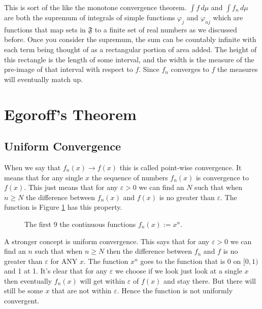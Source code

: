 \documentclass[oneside]{book}
\newenvironment{proof}[1][Proof]{\begin{trivlist}
\item[\hskip \labelsep {\bfseries #1}]}{\end{trivlist}}
\begin{document}
\begin{proof}
This is sort of the like the monotone convergence theorem. $\int f\, d\mu$ and $\int f_n\, d\mu$ are both the supremum of integrals of simple functions $\varphi_j$ and $\varphi_{nj}$ which are functions that map sets in $\mathfrak{F}$ to a finite set of real numbers as we discussed before. Once you consider the supremum, the sum can be countably infinite with each term being thought of as a rectangular portion of area added. The height of this rectangle is the length of some interval, and the width is the measure of the pre-image of that interval with respect to $f$. Since $f_n$ converges to $f$ the measures will eventually match up. 

\end{proof}

\section{Egoroff's Theorem}

\subsection{Uniform Convergence}
When we say that $f_n(x) \to f(x)$ this is called point-wise convergence. It means that for any single $x$ the sequence of numbers $f_n(x)$ is convergence to $f(x)$. This just means that for any $\varepsilon >0$ we can find an $N$ such that when $n \ge N$ the difference between $f_n(x)$ and $f(x)$ is no greater than $\varepsilon$. The function is Figure \ref{fig:uniformConvergence} has this property. 

\begin{figure}[h]
    \centering
    \caption{The first 9 the continuous functions $f_n(x) := x^n$.}
    \label{fig:uniformConvergence}
\end{figure}

A stronger concept is uniform convergence. This says that for any $\varepsilon >0$ we can find an $n$ such that when $n \ge N$ then the difference between $f_n$ and $f$ is no greater than $\varepsilon$ for ANY $x$. The function $x^n$ goes to the function that is 0 on $[0,1)$ and 1 at 1. It's clear that for any $\varepsilon$ we choose if we look just look at a single $x$ then eventually $f_n(x)$ will get within $\varepsilon$ of $f(x)$ and stay there. But there will still be some $x$ that are not within $\varepsilon$. Hence the function is not uniformly convergent.
\end{document}
